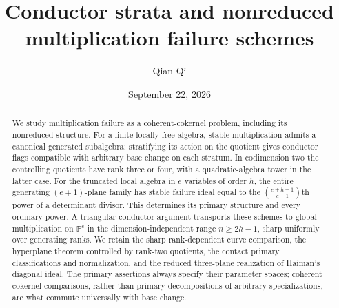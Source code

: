 \documentclass[11pt,reqno]{amsart}
\title[Conductor strata and multiplication failure]{Conductor strata and nonreduced\\multiplication failure schemes}
\author{Qian Qi}
\date{September 22, 2026}
\numberwithin{equation}{section}
\theoremstyle{definition}\newtheorem{definition}[theorem]{Definition}
\theoremstyle{remark}\newtheorem{remark}[theorem]{Remark}
\begin{document}
\begin{abstract}
We study multiplication failure as a coherent-cokernel problem, including its nonreduced structure. For a finite locally free algebra, stable multiplication admits a canonical generated subalgebra; stratifying its action on the quotient gives conductor flags compatible with arbitrary base change on each stratum. In codimension two the controlling quotients have rank three or four, with a quadratic-algebra tower in the latter case. For the truncated local algebra in $e$ variables of order $h$, the entire generating $(e+1)$-plane family has stable failure ideal equal to the $\binom{e+h-1}{e+1}$th power of a determinant divisor. This determines its primary structure and every ordinary power. A triangular conductor argument transports these schemes to global multiplication on $\mathbb P^e$ in the dimension-independent range $n\ge2h-1$, sharp uniformly over generating ranks. We retain the sharp rank-dependent curve comparison, the hyperplane theorem controlled by rank-two quotients, the contact primary classifications and normalization, and the reduced three-plane realization of Haiman's diagonal ideal. The primary assertions always specify their parameter spaces; coherent cokernel comparisons, rather than primary decompositions of arbitrary specializations, are what commute universally with base change.
\end{abstract}
\maketitle












\end{document}
